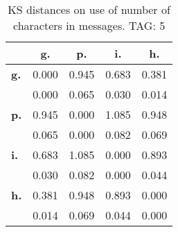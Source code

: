 \begin{table}[h!]
\begin{center}
\begin{tabular}{| l || c | c | c | c |}\hline
 & {\bf g.} & {\bf p.} & {\bf i.} & {\bf h.} \\\hline\hline
{\bf g.} & 0.000 & 0.945 & 0.683 & 0.381 \\
{\bf } & 0.000 & 0.065 & 0.030 & 0.014 \\\hline
{\bf p.} & 0.945 & 0.000 & 1.085 & 0.948 \\
{\bf } & 0.065 & 0.000 & 0.082 & 0.069 \\\hline
{\bf i.} & 0.683 & 1.085 & 0.000 & 0.893 \\
{\bf } & 0.030 & 0.082 & 0.000 & 0.044 \\\hline
{\bf h.} & 0.381 & 0.948 & 0.893 & 0.000 \\
{\bf } & 0.014 & 0.069 & 0.044 & 0.000 \\\hline
\end{tabular}
\caption{KS distances on use of number of characters in messages. TAG: 5}
\end{center}
\end{table}